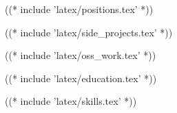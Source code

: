 \documentclass[10pt]{barag_resume}
\begin{document}
    ((* include 'latex/positions.tex' *))

    \newpage %
    ((* include 'latex/side_projects.tex' *))

    ((* include 'latex/oss_work.tex' *))

    ((* include 'latex/education.tex' *))

    ((* include 'latex/skills.tex' *))
\end{document}

